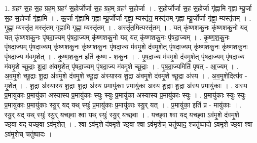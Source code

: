 \documentclass[17pt]{extarticle}
\begin{document}
1. ग्रहꣳ॑ स॒ह स॒ह ग्रह॒म् ग्रहꣳ॑ स॒होर्जोर्जा स॒ह ग्रह॒म् ग्रहꣳ॑ स॒होर्जा । . स॒होर्जोर्जा स॒ह स॒होर्जा गृ॑ह्णामि गृह्णा म्यू॒र्जा स॒ह स॒होर्जा गृ॑ह्णामि । . ऊ॒र्जा गृ॑ह्णामि गृह्णा म्यू॒र्जोर्जा गृ॑ह्णा॒ म्यस्तृ॑त॒ मस्तृ॑तम् गृह्णा म्यू॒र्जोर्जा गृ॑ह्णा॒ म्यस्तृ॑तम् । . गृ॒ह्णा॒ म्यस्तृ॑त॒ मस्तृ॑तम् गृह्णामि गृह्णा॒ म्यस्तृ॑तम् । . अस्तृ॑त॒मित्यस्तृ॑तम् । . यत् कृ॑ष्णशकु॒नः कृ॑ष्णशकु॒नो यद् यत् कृ॑ष्णशकु॒नः पृ॑षदा॒ज्यम् पृ॑षदा॒ज्यम् कृ॑ष्णशकु॒नो यद् यत् कृ॑ष्णशकु॒नः पृ॑षदा॒ज्यम् । . कृ॒ष्ण॒श॒कु॒नः पृ॑षदा॒ज्यम् पृ॑षदा॒ज्यम् कृ॑ष्णशकु॒नः कृ॑ष्णशकु॒नः पृ॑षदा॒ज्य म॑वमृ॒शे द॑वमृ॒शेत् पृ॑षदा॒ज्यम् कृ॑ष्णशकु॒नः कृ॑ष्णशकु॒नः पृ॑षदा॒ज्य म॑वमृ॒शेत् । . कृ॒ष्ण॒श॒कु॒न इति॑ कृष्ण - श॒कु॒नः । . पृ॒ष॒दा॒ज्य म॑वमृ॒शे द॑वमृ॒शेत् पृ॑षदा॒ज्यम् पृ॑षदा॒ज्य म॑वमृ॒शे च्छू॒द्राः शू॒द्रा अ॑वमृ॒शेत् पृ॑षदा॒ज्यम् पृ॑षदा॒ज्य म॑वमृ॒शे च्छू॒द्राः । . पृ॒ष॒दा॒ज्यमिति॑ पृषत् - आ॒ज्यम् । . अ॒व॒मृ॒शे च्छू॒द्राः शू॒द्रा अ॑वमृ॒शे द॑वमृ॒शे च्छू॒द्रा अ॑स्यास्य शू॒द्रा अ॑वमृ॒शे द॑वमृ॒शे च्छू॒द्रा अ॑स्य । . अ॒व॒मृ॒शेदित्य॑व - मृ॒शेत् । . शू॒द्रा अ॑स्यास्य शू॒द्राः शू॒द्रा अ॑स्य प्र॒मायु॑काः प्र॒मायु॑का अस्य शू॒द्राः शू॒द्रा अ॑स्य प्र॒मायु॑काः । . अ॒स्य॒ प्र॒मायु॑काः प्र॒मायु॑का अस्यास्य प्र॒मायु॑काः स्युः स्युः प्र॒मायु॑का अस्यास्य प्र॒मायु॑काः स्युः । . प्र॒मायु॑काः स्युः स्युः प्र॒मायु॑काः प्र॒मायु॑काः स्यु॒र् यद् यथ् स्युः॑ प्र॒मायु॑काः प्र॒मायु॑काः स्यु॒र् यत् । . प्र॒मायु॑का॒ इति॑ प्र - मायु॑काः । . स्यु॒र् यद् यथ् स्युः॑ स्यु॒र् यच्छ्‌वा श्वा यथ् स्युः॑ स्यु॒र् यच्छ्‌वा । . यच्छ्‌वा श्वा यद् यच्छ्‌वा ऽव॑मृ॒शे द॑वमृ॒शे च्छ्‌वा यद् यच्छ्‌वा ऽव॑मृ॒शेत् । . श्वा ऽव॑मृ॒शे द॑वमृ॒शे च्छ्‌वा श्वा ऽव॑मृ॒शेच् चतु॑ष्पाद॒ श्चतु॑ष्पादो ऽवमृ॒शे च्छ्‌वा श्वा ऽव॑मृ॒शेच् चतु॑ष्पादः । \newline
\end{document}
